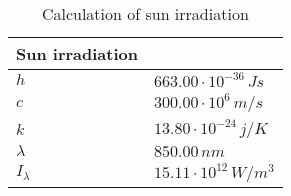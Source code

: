 \begin{table}[H]
\centering
\caption{Calculation of sun irradiation}
\label{tab:sun_irradiation}
\begin{tabular}{|l|l|}\hline
    \textbf{Sun irradiation} & \\
    \hline 
    $h$ & $663.00\cdot10^{-36}\,Js$ \\
    $c$ & $300.00\cdot10^6\,m/s$ \\
    $k$ & $13.80\cdot10^{-24}\,j/K$ \\
    $\lambda$ & $850.00\,n m$ \\
    $I_\lambda$ & $15.11\cdot10^{12}\,W/m^3$ \\
    \hline 
\end{tabular}
\end{table}
